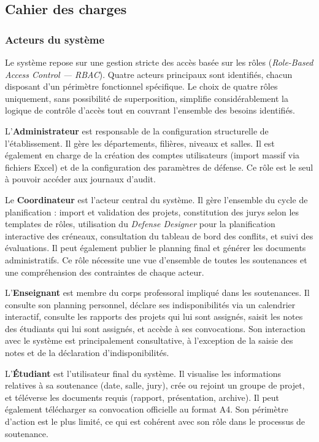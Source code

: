\subsection{Cahier des charges}
\label{ch3:cahier_charges}

\subsubsection{Acteurs du système}
\label{ch3:acteurs}

Le système repose sur une gestion stricte des accès basée sur les rôles (\textit{Role-Based Access Control — RBAC}). Quatre acteurs principaux sont identifiés, chacun disposant d'un périmètre fonctionnel spécifique. Le choix de quatre rôles uniquement, sans possibilité de superposition, simplifie considérablement la logique de contrôle d'accès tout en couvrant l'ensemble des besoins identifiés.

L'\textbf{Administrateur} est responsable de la configuration structurelle de l'établissement. Il gère les départements, filières, niveaux et salles. Il est également en charge de la création des comptes utilisateurs (import massif via fichiers Excel) et de la configuration des paramètres de défense. Ce rôle est le seul à pouvoir accéder aux journaux d'audit.

Le \textbf{Coordinateur} est l'acteur central du système. Il gère l'ensemble du cycle de planification : import et validation des projets, constitution des jurys selon les templates de rôles, utilisation du \textit{Defense Designer} pour la planification interactive des créneaux, consultation du tableau de bord des conflits, et suivi des évaluations. Il peut également publier le planning final et générer les documents administratifs. Ce rôle nécessite une vue d'ensemble de toutes les soutenances et une compréhension des contraintes de chaque acteur.

L'\textbf{Enseignant} est membre du corps professoral impliqué dans les soutenances. Il consulte son planning personnel, déclare ses indisponibilités via un calendrier interactif, consulte les rapports des projets qui lui sont assignés, saisit les notes des étudiants qui lui sont assignés, et accède à ses convocations. Son interaction avec le système est principalement consultative, à l'exception de la saisie des notes et de la déclaration d'indisponibilités.

L'\textbf{Étudiant} est l'utilisateur final du système. Il visualise les informations relatives à sa soutenance (date, salle, jury), crée ou rejoint un groupe de projet, et téléverse les documents requis (rapport, présentation, archive). Il peut également télécharger sa convocation officielle au format A4. Son périmètre d'action est le plus limité, ce qui est cohérent avec son rôle dans le processus de soutenance.

